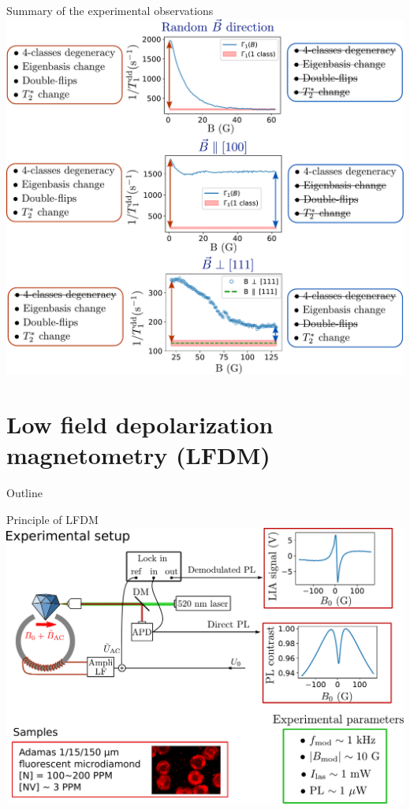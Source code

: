 \documentclass{beamer}
\begin{document}
\begin{frame}{Summary of the experimental observations}
\centering
\includegraphics[width=\textwidth,height=0.9\textheight,keepaspectratio]{shema_summary_exp}
\end{frame}

\section{Low field depolarization magnetometry (LFDM)}
\begin{frame}{Outline}
\tableofcontents[currentsection]
\end{frame}
\begin{frame}{Principle of LFDM}
\centering
\includegraphics[width=\textwidth,height=0.9\textheight,keepaspectratio]{Slide_principle_LFDM}
\end{frame}
\end{document}
